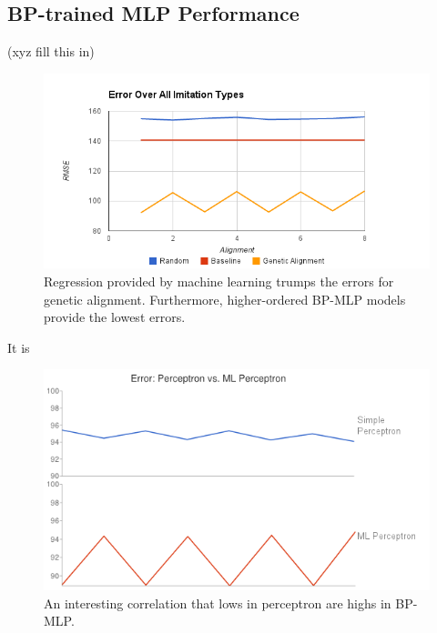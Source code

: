 
\clearpage

\subsection{BP-trained MLP Performance}
(xyz fill this in)

\begin{figure}[center]
	\centering
	\includegraphics[width=16cm]{images/total_error_all_approaches.png}
	\caption{Regression provided by machine learning trumps the errors for genetic alignment. Furthermore, higher-ordered BP-MLP models provide the lowest errors.}
	\label{fig:overall_ml}
\end{figure}

It is 
\begin{figure}[center]
	\centering
	\includegraphics[width=12cm]{images/Perceptron_vs_ML.png}
	\caption{An interesting correlation that lows in perceptron are highs in BP-MLP.}
	\label{fig:perceptron_vs_bp}
\end{figure}
\clearpage

